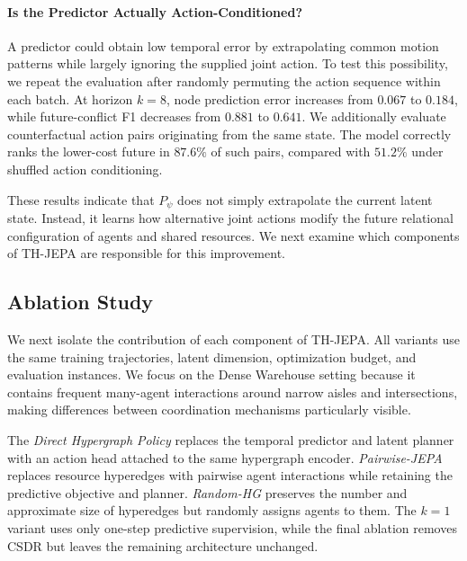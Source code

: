 \documentclass{article} %
\begin{document}
\paragraph{Is the Predictor Actually Action-Conditioned?}
A predictor could obtain low temporal error by extrapolating common motion patterns while largely ignoring the supplied joint action. To test this possibility, we repeat the evaluation after randomly permuting the action sequence within each batch. At horizon $k=8$, node prediction error increases from $0.067$ to $0.184$, while future-conflict F1 decreases from $0.881$ to $0.641$. We additionally evaluate counterfactual action pairs originating from the same state. The model correctly ranks the lower-cost future in $87.6\%$ of such pairs, compared with $51.2\%$ under shuffled action conditioning.

These results indicate that $P_\psi$ does not simply extrapolate the current latent state. Instead, it learns how alternative joint actions modify the future relational configuration of agents and shared resources. We next examine which components of TH-JEPA are responsible for this improvement.


\subsection{Ablation Study}
\label{sec:ablation}

We next isolate the contribution of each component of TH-JEPA. All variants use the same training trajectories, latent dimension, optimization budget, and evaluation instances. We focus on the Dense Warehouse setting because it contains frequent many-agent interactions around narrow aisles and intersections, making differences between coordination mechanisms particularly visible.

The \emph{Direct Hypergraph Policy} replaces the temporal predictor and latent planner with an action head attached to the same hypergraph encoder. \emph{Pairwise-JEPA} replaces resource hyperedges with pairwise agent interactions while retaining the predictive objective and planner. \emph{Random-HG} preserves the number and approximate size of hyperedges but randomly assigns agents to them. The $k=1$ variant uses only one-step predictive supervision, while the final ablation removes CSDR but leaves the remaining architecture unchanged.
\end{document}
